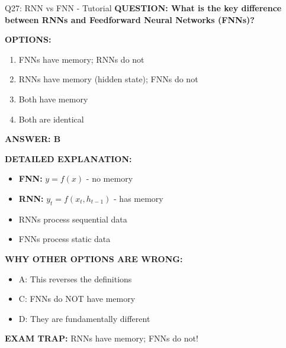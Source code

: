 \documentclass[8pt]{beamer}
\begin{document}
	\begin{frame}{Q27: RNN vs FNN - Tutorial}
		\fontsize{6.5}{7.5}\selectfont
		\textbf{QUESTION: What is the key difference between RNNs and Feedforward Neural Networks (FNNs)?}
		
		\vspace{0.1cm}
		\textbf{OPTIONS:}
		\begin{enumerate}
			\item FNNs have memory; RNNs do not
			\item RNNs have memory (hidden state); FNNs do not
			\item Both have memory
			\item Both are identical
		\end{enumerate}
		
		\vspace{0.1cm}
		\textcolor{myblue}{\textbf{ANSWER: B}}
		
		\vspace{0.1cm}
		\textbf{DETAILED EXPLANATION:}
		\begin{itemize}
			\item \textbf{FNN:} $y = f(x)$ - no memory
			\item \textbf{RNN:} $y_t = f(x_t, h_{t-1})$ - has memory
			\item RNNs process sequential data
			\item FNNs process static data
		\end{itemize}
		
		\vspace{0.1cm}
		\textcolor{myred}{\textbf{WHY OTHER OPTIONS ARE WRONG:}}
		\begin{itemize}
			\item \textcolor{myred}{A:} This reverses the definitions
			\item \textcolor{myred}{C:} FNNs do NOT have memory
			\item \textcolor{myred}{D:} They are fundamentally different
		\end{itemize}
		
		\textcolor{myred}{\textbf{EXAM TRAP:}} RNNs have \textcolor{myblue}{memory}; FNNs do not!
	\end{frame}
	
\end{document}

